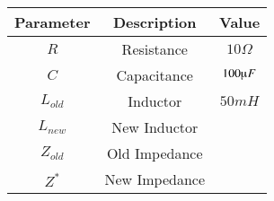 \begin{tabular}{|c|c|c|}
\hline
   \textbf{Parameter}  & \textbf{Description} & \textbf{Value}\\
   \hline
   $R$   & Resistance & $10 \Omega$\\
   \hline
  $C$ & Capacitance & $100 \micro F$ \\
  \hline
  $L_{old}$ & Inductor & $50mH$\\
  \hline
  $L_{new}$ & New Inductor &    \\
  \hline
  $Z_{old}$ & Old Impedance & \\
  \hline
  $Z^*$ &New Impedance & \\
  \hline
  
\end{tabular}
